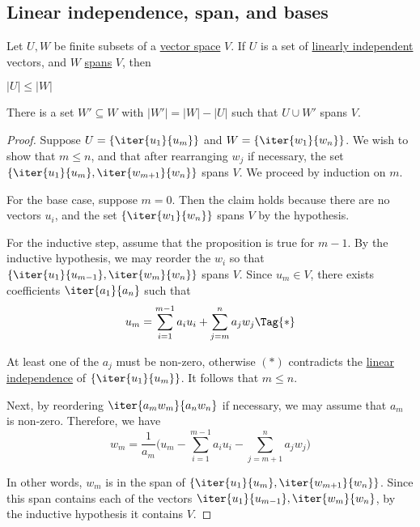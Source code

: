 \subsection{Linear independence, span, and bases}\label{d63fa20}

\label{afcb195}

Let $U,W$ be finite subsets of a \href{fc83050}{vector space} $V$. If $U$ is a
set of \href{c133a44}{linearly independent} vectors, and $W$
\href{ac574be}{spans} $V$, then
\begin{enumerati}
  \item $|U|\leq|W|$
  \item There is a set $W'\subseteq W$ with $|W'|=|W|-|U|$ such that $U\cup W'$
        spans $V$.
\end{enumerati}

\begin{proof}
  \def\W#1#2{\iter{w_{#1}}{w_{#2}}}
  \def\U#1#2{\iter{u_{#1}}{u_{#2}}}

  Suppose $U=\{\U1m\}$ and $W=\{\W1n\}$. We wish to show that $m\leq n$, and
  that after rearranging $w_j$ if necessary, the set $\{\U1m,\W{m+1}n\}$ spans
  $V$. We proceed by induction on $m$.

  For the base case, suppose $m=0$. Then the claim holds because there are no
  vectors $u_i$, and the set $\{\W1n\}$ spans $V$ by the hypothesis.

  For the inductive step, assume that the proposition is true for $m-1$. By the
  inductive hypothesis, we may reorder the $w_i$ so that $\{\U1{m-1},\W{m}n\}$
  spans $V$. Since $u_m\in V$, there exists coefficients $\iter{a_1}{a_n}$ such
  that
  \begin{equation*}
    u_m=\sum_{i=1}^{m-1}a_iu_i+\sum_{j=m}^na_jw_j\Tag{*}
  \end{equation*}

  At least one of the $a_j$ must be non-zero, otherwise $(*)$ contradicts the
  \href{c133a44}{linear independence} of $\{\U1m\}$. It follows that $m\leq n$.

  Next, by reordering $\iter{a_mw_m}{a_nw_n}$ if necessary, we may assume that
  $a_m$ is non-zero. Therefore, we have
  $$
    w_m=\frac1{a_m}\biggr(
    u_m-\sum_{i=1}^{m-1}a_iu_i-\sum_{j=m+1}^{n}a_jw_j
    \biggl)
  $$

  In other words, $w_m$ is in the span of $\{\U1{m},\W{m+1}n\}$. Since this
  span contains each of the vectors $\U1{m-1},\W{m}n$, by the inductive
  hypothesis it contains $V$.
\end{proof}

